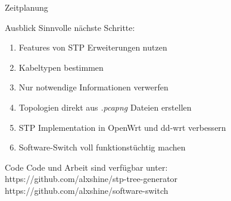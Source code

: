 \documentclass{beamer}
\begin{document}
\begin{frame}{Zeitplanung}
\begin{figure}
    \end{figure}

\end{frame}

\begin{frame}{Ausblick}
    Sinnvolle nächste Schritte:
    \begin{enumerate}[<+(1)->]
        \item Features von STP Erweiterungen nutzen
        \item Kabeltypen bestimmen
        \item Nur notwendige Informationen verwerfen
        \item Topologien direkt aus \textit{.pcapng} Dateien erstellen
        \item STP Implementation in OpenWrt und dd-wrt verbessern
        \item Software-Switch voll funktionstüchtig machen
    \end{enumerate}
\end{frame}

\begin{frame}{Code}
    Code und Arbeit sind verfügbar unter:\\
    \vspace{0.5cm}
    https://github.com/alxshine/stp-tree-generator\\
    https://github.com/alxshine/software-switch
\end{frame}
\end{document}

